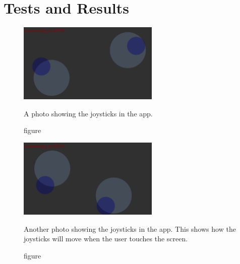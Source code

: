 \section{Tests and Results}
\par
\begin{figure}[H]
\centering
  \includegraphics[width=0.6\textwidth]{sections/testRes/app1}
    \caption{figure}{A photo showing the joysticks in the app.}
\end{figure}
\begin{figure}[H]
\centering
  \includegraphics[width=0.6\textwidth]{sections/testRes/app2}
    \caption{figure}{Another photo showing the joysticks in the app. This shows how the joysticks will move when the user touches the screen.}
\end{figure}
